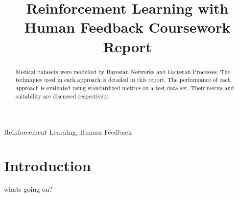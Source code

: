 \documentclass[conference]{IEEEtran}
\begin{document}
\title{Reinforcement Learning with Human Feedback Coursework Report}

\author{
}

\maketitle

\begin{abstract}
    Medical datasets were modelled by Bayesian Networks and Gaussian Processes.
    The techniques used in each approach is detailed in this report.
    The performance of each approach is evaluated using standardized metrics on a test data set.
    Their merits and suitability are discussed respectively.
\end{abstract}

\begin{IEEEkeywords}
    Reinforcement Learning, Human Feedback
\end{IEEEkeywords}

\section{Introduction}


whats going on? \cite{noauthor_probabilistic_nodate}


\end{document}

